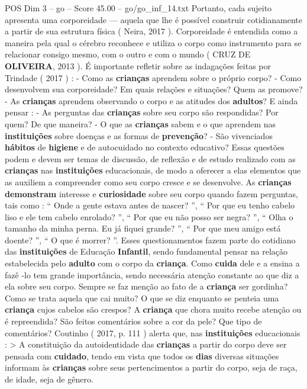 \begin{textsample}{POS Dim 3 – go – Score 45.00 – go/go\_inf\_14.txt}
Portanto, cada sujeito apresenta uma corporeidade — aquela que lhe é possível construir cotidianamente a partir de sua estrutura física ( Neira, 2017 ).
Corporeidade é entendida como a maneira pela qual o cérebro reconhece e utiliza o corpo como instrumento para se relacionar consigo mesmo, com o outro e com o mundo ( CRUZ DE \textbf{OLIVEIRA}, 2013 ).
É importante refletir sobre as indagações feitas por Trindade ( 2017 ) : - Como as \textbf{crianças} aprendem sobre o próprio corpo? - Como desenvolvem sua corporeidade?
Em quais relações e situações?
Quem as promove? - As \textbf{crianças} aprendem observando o corpo e as atitudes dos \textbf{adultos}?
E ainda pensar : - As perguntas das \textbf{crianças} sobre seu corpo são respondidas?
Por quem?
De que maneira? - O que as \textbf{crianças} sabem e o que aprendem nas \textbf{instituições} sobre doenças e as formas de \textbf{prevenção}? - São vivenciados \textbf{hábitos} de \textbf{higiene} e de autocuidado no contexto educativo?
Essas questões podem e devem ser temas de discussão, de reflexão e de estudo realizado com as \textbf{crianças} nas \textbf{instituições} educacionais, de modo a oferecer a elas elementos que as auxiliem a compreender como seu corpo cresce e se desenvolve.
As \textbf{crianças} \textbf{demonstram} interesse e \textbf{curiosidade} sobre seu corpo quando fazem perguntas, tais como : “ Onde a gente estava antes de nascer? ”, “ Por que eu tenho cabelo liso e ele tem cabelo enrolado? ”, “ Por que eu não posso ser negra? ”, “ Olha o tamanho da minha perna.
Eu já fiquei grande? ”, “ Por que meu amigo está doente? ”, “ O que é morrer? ”.
Esses questionamentos fazem parte do cotidiano das \textbf{instituições} de Educação \textbf{Infantil}, sendo fundamental pensar na relação estabelecida pelo \textbf{adulto} com o corpo da \textbf{criança}.
Como \textbf{cuida} dele e a ensina a fazê -lo tem grande importância, sendo necessária atenção constante ao que diz a ela sobre seu corpo.
Sempre se faz menção ao fato de a \textbf{criança} ser gordinha?
Como se trata aquela que cai muito?
O que se diz enquanto se penteia uma \textbf{criança} cujos cabelos são crespos?
A \textbf{criança} que chora muito recebe atenção ou é repreendida?
São feitos comentários sobre a cor da pele?
Que tipo de comentários?
Coutinho ( 2017, p. 111 ) alerta que, nas \textbf{instituições} educacionais : > A constituição da autoidentidade das \textbf{crianças} a partir do corpo deve ser pensada com \textbf{cuidado}, tendo em vista que todos os \textbf{dias} diversas situações informam às \textbf{crianças} sobre seus pertencimentos a partir do corpo, seja de raça, de idade, seja de gênero.

\end{textsample}
